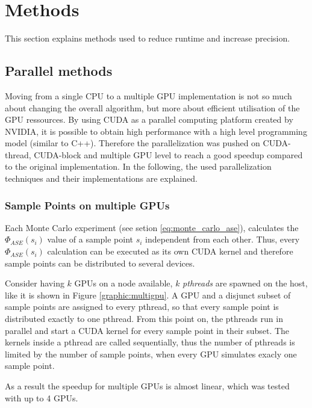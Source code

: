 \section{Methods}
This section explains methods used to reduce runtime and
increase precision.

\subsection{Parallel methods}
\label{subsec:parallel_methods}
Moving from a single CPU to a multiple
GPU implementation is not so much about changing the overall algorithm,
but more about efficient utilisation of the GPU ressources. 
By using CUDA as a parallel computing platform created by NVIDIA,
it is possible to obtain high performance with a high level 
programming model (similar to C++). Therefore the parallelization was pushed on CUDA-thread, 
CUDA-block and multiple GPU level to reach a good speedup compared to 
the original implementation.
In the following, the used parallelization
techniques and their implementations are explained.

\subsubsection{Sample Points on multiple GPUs}

Each Monte Carlo experiment (see setion \ref{eq:monte_carlo_ase}), calculates the $\Phi_{ASE}(s_i)$ 
value of a sample point $s_i$ independent from each other.
Thus, every $\Phi_{ASE}(s_i)$ calculation can be executed as its own CUDA kernel
and therefore sample points can be distributed to several devices.

Consider having $k$ GPUs on a node available, 
$k$ \emph{pthreads} are spawned on the host, like it
is shown in Figure \ref{graphic:multigpu}. A GPU and a
disjunct subset of sample points are assigned to every pthread, so that every
sample point is distributed exactly to one pthread.
From this point on, the pthreads run in parallel and start a
CUDA kernel for every sample point in their subset.
The kernels inside a pthread are called sequentially,
thus the number of pthreads is limited by the number of sample points, when 
every GPU simulates exacly one sample point.

As a result the speedup for multiple
GPUs is almost linear, which was tested with up to 4 GPUs.
    

